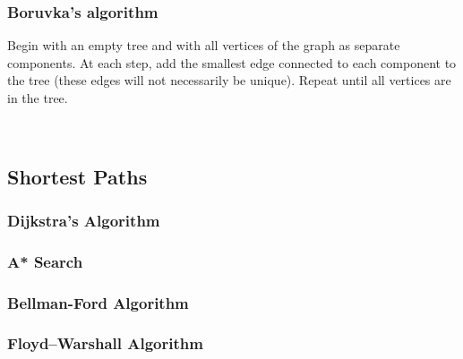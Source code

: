 \documentclass[a4paper]{article}
\theoremstyle{definition}
\begin{document}
\subsubsection{Boruvka’s algorithm}
Begin with an empty tree and with all vertices of the graph as separate components. At each step, add the smallest edge connected to each component to the tree (these edges will not necessarily be unique). Repeat until all vertices are in the tree. 
\setcounter{subfigure}{0}

\begin{figure}[H]\centering
 ~
 ~
\end{figure}
\subsection{Shortest Paths}
\subsubsection{Dijkstra's Algorithm}
\subsubsection{A* Search}
\subsubsection{Bellman-Ford Algorithm}
\subsubsection{Floyd–Warshall Algorithm}
\end{document}
